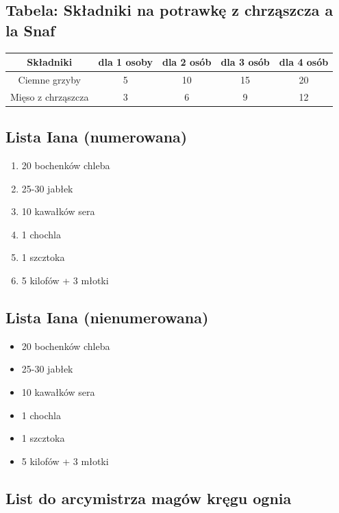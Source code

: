 \newpage

\subsection{Tabela: Składniki na potrawkę z chrząszcza a la Snaf}
\label{tab: ściganie}

\begin{table}[h!]
\centering
\begin{tabular}{|c|c|c|c|c|}
\hline
\textbf{Składniki} & dla 1 osoby & dla 2 osób & dla 3 osób& dla 4 osób\\ \hline
Ciemne grzyby           & 5     &10     &15     &20    \\ \hline
Mięso z chrząszcza      & 3     &6      &9      &12    \\ \hline
\end{tabular}
\end{table}


\subsection{Lista Iana (numerowana)}

\begin{enumerate}
    \item 20 bochenków chleba
    \item 25-30 jabłek
    \item 10 kawałków sera
    \item 1 chochla
    \item 1 szcztoka
    \item 5 kilofów + 3 młotki
\end{enumerate}

\subsection{Lista Iana (nienumerowana)}

\begin{itemize}
    \item 20 bochenków chleba
    \item 25-30 jabłek
    \item 10 kawałków sera
    \item 1 chochla
    \item 1 szcztoka
    \item 5 kilofów + 3 młotki
\end{itemize}

\subsection{List do arcymistrza magów kręgu ognia}

